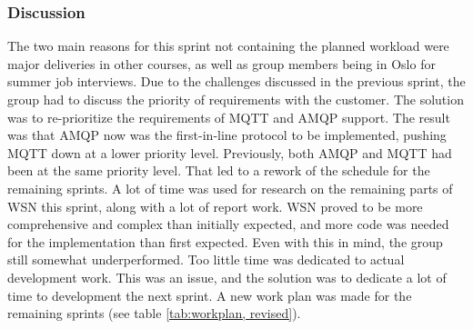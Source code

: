 \subsubsection{Discussion}
\label{subsec:project_lifecycle-development-sprint_4-discussion}

The two main reasons for this sprint not containing the planned workload were major deliveries in other courses, as well as group members being in Oslo for summer job interviews. Due to the challenges discussed in the previous sprint, the group had to discuss the priority of requirements with the customer. The solution was to re-prioritize the requirements of MQTT and AMQP support. The result was that AMQP now was the first-in-line protocol to be implemented, pushing MQTT down at a lower priority level. Previously, both AMQP and MQTT had been at the same priority level. That led to a rework of the schedule for the remaining sprints. A lot of time was used for research on the remaining parts of WSN this sprint, along with a lot of report work. WSN proved to be more comprehensive and complex than initially expected, and more code was needed for the implementation than first expected. Even with this in mind, the group still somewhat underperformed. Too little time was dedicated to actual development work. This was an issue, and the solution was to dedicate a lot of time to development the next sprint. A new work plan was made for the remaining sprints (see table \ref{tab:workplan, revised}).


